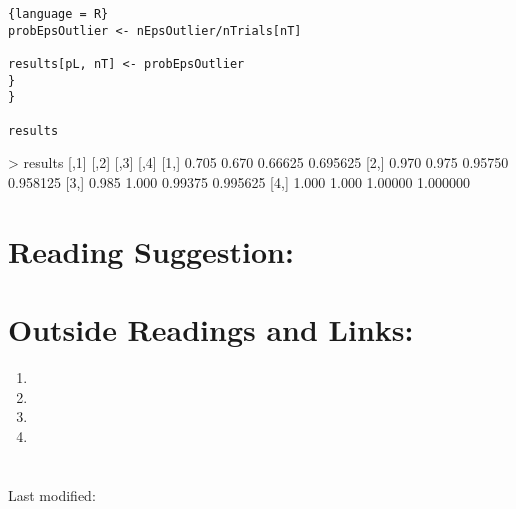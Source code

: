 \documentclass[12pt]{article}
\begin{document}
\begin{solution}
\begin{lstlisting}{language = R}
probEpsOutlier <- nEpsOutlier/nTrials[nT]

results[pL, nT] <- probEpsOutlier
}
}

results
\end{lstlisting}

\begin{verbatim*}
  > results
      [,1]  [,2]    [,3]     [,4]
[1,] 0.705 0.670 0.66625 0.695625
[2,] 0.970 0.975 0.95750 0.958125
[3,] 0.985 1.000 0.99375 0.995625
[4,] 1.000 1.000 1.00000 1.000000
\end{verbatim*}

\end{solution}

\hr

\section*{Reading Suggestion:}




\hr

\section*{Outside Readings and Links:}
\begin{enumerate}
    \item
    \item
    \item
    \item
\end{enumerate}

\section*{\solutionsname} \loadSolutions

\hr

\mydisclaim \myfooter

Last modified:  \flastmod
\end{document}
